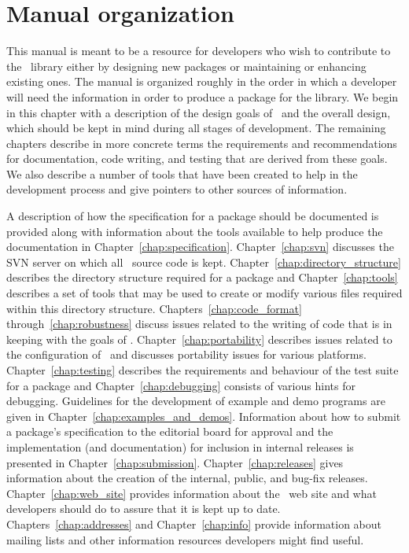 \section{Manual organization\label{sec:manual_org}}

This manual is meant to be a resource for developers who wish to contribute
to the \cgal\ library either by designing new packages or maintaining
or enhancing existing ones. The manual is organized roughly in the order in
which a developer will need the information in order to produce a package
for the library. We begin in this chapter with a description
of the design goals of \cgal\ and the overall design, which should be kept
in mind during all stages of development.  The remaining chapters describe
in more concrete terms the requirements and recommendations for documentation,
code writing, and testing that are derived from these goals.  We also describe
a number of tools that have been created to help in the development process
and give pointers to other sources of information.

A description of how the specification
for a package should be documented is provided along with information about
the tools available to help produce the documentation
in Chapter~\ref{chap:specification}.
Chapter~\ref{chap:svn} discusses the SVN server on which all \cgal\ source
code is kept.
Chapter~\ref{chap:directory_structure} describes the directory structure
required for a package and Chapter~\ref{chap:tools} describes a set of tools
that may be used to create or modify various files required within this
directory structure. Chapters~\ref{chap:code_format}
through~\ref{chap:robustness}
discuss issues related to the writing of code that is in keeping with
the goals of \cgal.  Chapter~\ref{chap:portability} describes issues
related to the configuration of \cgal\ and
discusses portability issues for various platforms. Chapter~\ref{chap:testing}
describes the requirements and behaviour of the test suite for a package and
Chapter~\ref{chap:debugging} consists of various hints for debugging.
Guidelines for the development of example and demo programs are given in
Chapter~\ref{chap:examples_and_demos}. Information
about how to submit a package's specification to the editorial board
for approval and the implementation (and documentation) for inclusion in
internal releases is presented in  Chapter~\ref{chap:submission}.
Chapter~\ref{chap:releases} gives information about the creation of the
internal, public, and bug-fix releases.  Chapter~\ref{chap:web_site}
provides information about the \cgal\ web site and what developers should
do to assure that it is kept up to date.
Chapters~\ref{chap:addresses} and Chapter~\ref{chap:info}
provide information about mailing lists and other information
resources developers might find useful.
